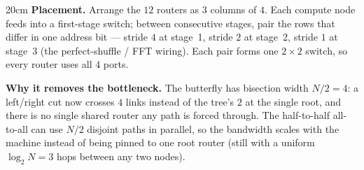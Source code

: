 \begin{parts}
\begin{solutionbox}{20cm}
    \textbf{Placement.} Arrange the $12$ routers as $3$ columns of $4$. Each compute
    node feeds into a first-stage switch; between consecutive stages, pair the rows
    that differ in one address bit — stride $4$ at stage~1, stride $2$ at stage~2,
    stride $1$ at stage~3 (the perfect-shuffle / FFT wiring). Each pair forms one
    $2\times2$ switch, so every router uses all $4$ ports.

    \begin{center}
    \end{center}

    \textbf{Why it removes the bottleneck.} The butterfly has bisection width $N/2 = 4$:
    a left/right cut now crosses $4$ links instead of the tree's $2$ at the single
    root, and there is no single shared router any path is forced through. The
    half-to-half all-to-all can use $N/2$ disjoint paths in parallel, so the
    bandwidth scales with the machine instead of being pinned to one root router
    (still with a uniform $\log_2 N = 3$ hops between any two nodes).
    \end{solutionbox}
\end{parts}
